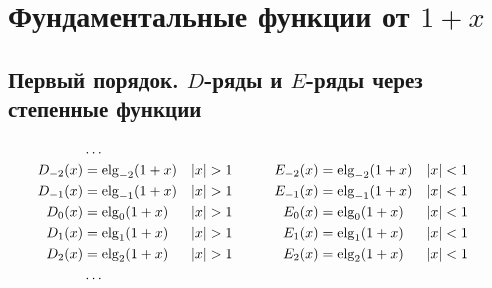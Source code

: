 
\section{Фундаментальные функции от $ 1 + x $}

\subsection{Первый порядок. $D$-ряды и $E$-ряды через степенные функции}

\begin{equation*} \begin{aligned}
&\ldots \\
D_{-2}(x) &= \elg_{-2}(1 + x) &
&|x| > 1 &
&\quad &
E_{-2}(x) &= \elg_{-2}(1 + x) &
&|x| < 1 \\
%
D_{-1}(x) &= \elg_{-1}(1 + x) &
&|x| > 1 &
&\quad &
E_{-1}(x) &= \elg_{-1}(1 + x) &
&|x| < 1 \\
%
D_0(x) &= \elg_0(1 + x) &
&|x| > 1 &
&\quad &
E_0(x) &= \elg_0(1 + x) &
&|x| < 1 \\
%
D_1(x) &= \elg_1(1 + x) &
&|x| > 1 &
&\quad &
E_1(x) &= \elg_1(1 + x) &
&|x| < 1 \\
%
D_2(x) &= \elg_2(1 + x) &
&|x| > 1 &
&\quad &
E_2(x) &= \elg_2(1 + x) &
&|x| < 1 \\
%
&\ldots \\
\end{aligned} \end{equation*}

